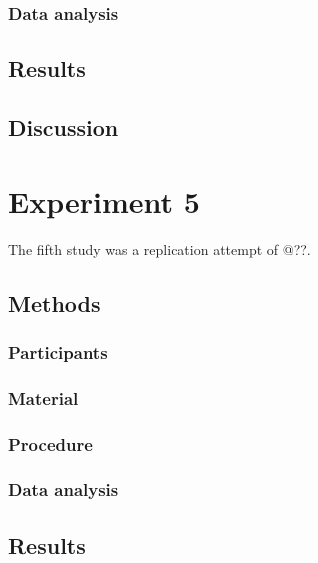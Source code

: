 \documentclass[
  english,
  man]{apa6}
\begin{document}
\hypertarget{data-analysis-2}{%
\subsubsection{Data analysis}\label{data-analysis-2}}

\hypertarget{results-3}{%
\subsection{Results}\label{results-3}}

\hypertarget{discussion-3}{%
\subsection{Discussion}\label{discussion-3}}

\hypertarget{experiment-5}{%
\section{Experiment 5}\label{experiment-5}}

The fifth study was a replication attempt of @??.

\hypertarget{methods-4}{%
\subsection{Methods}\label{methods-4}}

\hypertarget{participants-4}{%
\subsubsection{Participants}\label{participants-4}}

\hypertarget{material-3}{%
\subsubsection{Material}\label{material-3}}

\hypertarget{procedure-4}{%
\subsubsection{Procedure}\label{procedure-4}}

\hypertarget{data-analysis-3}{%
\subsubsection{Data analysis}\label{data-analysis-3}}

\hypertarget{results-4}{%
\subsection{Results}\label{results-4}}
\end{document}
